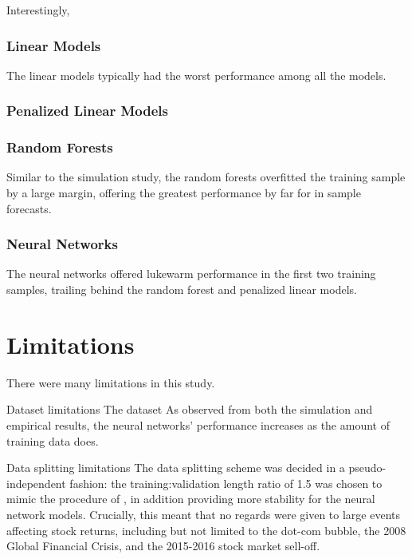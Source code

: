 \documentclass[a4paper, table]{article}
\begin{document}
Interestingly, 

\subsubsection{Linear Models}

The linear models typically had the worst performance among all the models.

\subsubsection{Penalized Linear Models}



\subsubsection{Random Forests}

Similar to the simulation study, the random forests overfitted the training sample by a large margin, offering the greatest performance by far for in sample forecasts.

\subsubsection{Neural Networks}

The neural networks offered lukewarm performance in the first two training samples, trailing behind the random forest and penalized linear models. 

\section{Limitations}

There were many limitations in this study.

Dataset limitations
The dataset 
As observed from both the simulation and empirical results, the neural networks' performance increases as the amount of training data does. 

Data splitting limitations
The data splitting scheme was decided in a pseudo-independent fashion: the training:validation length ratio of 1.5 was chosen to mimic the procedure of \cite{gu_empirical_2018}, in addition providing more stability for the neural network models. Crucially, this meant that no regards were given to large events affecting stock returns, including but not limited to the dot-com bubble, the 2008 Global Financial Crisis, and the 2015-2016 stock market sell-off. 
\end{document}
